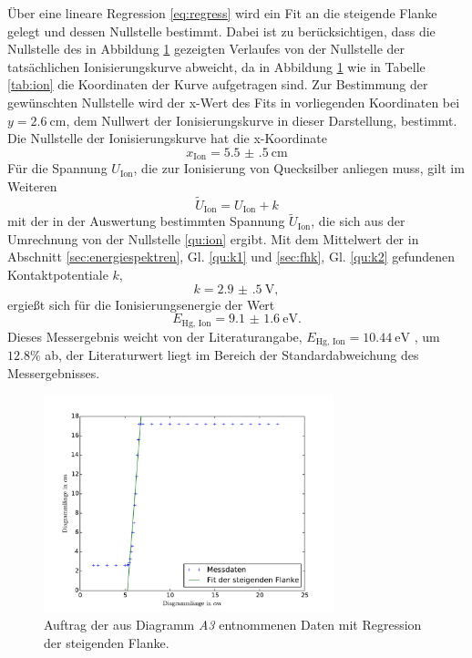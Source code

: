 Über eine lineare Regression \eqref{eq:regress} wird ein Fit an die steigende Flanke gelegt und dessen Nullstelle bestimmt.
Dabei ist zu berücksichtigen, dass die Nullstelle des in Abbildung \ref{fig:ion} gezeigten Verlaufes von der Nullstelle der tatsächlichen Ionisierungskurve abweicht, da in Abbildung \ref{fig:ion} wie in Tabelle \ref{tab:ion} die Koordinaten der Kurve aufgetragen sind.
Zur Bestimmung der gewünschten Nullstelle wird der x-Wert des Fits in vorliegenden Koordinaten bei $y=\SI{2.6}{\centi\meter}$, dem Nullwert der Ionisierungskurve in dieser Darstellung, bestimmt.
Die Nullstelle der Ionisierungskurve hat die x-Koordinate%
\begin{equation}
	x_\text{Ion}=\SI{5.5(5)}{\centi\meter}
	\label{qu:ion}
\end{equation}
Für die Spannung $U_\text{Ion}$, die zur Ionisierung von Quecksilber anliegen muss, gilt im Weiteren
\begin{equation}
	\tilde{U}_\text{Ion}=U_\text{Ion}+k
\end{equation}
mit der in der Auswertung bestimmten Spannung $\tilde{U}_\text{Ion}$, die sich aus der Umrechnung von der Nullstelle \ref{qu:ion} ergibt.
Mit dem Mittelwert der in Abschnitt \ref{sec:energiespektren}, Gl. \eqref{qu:k1} und \ref{sec:fhk}, Gl. \eqref{qu:k2} gefundenen Kontaktpotentiale $k$,
\begin{equation}
	k=\SI{2.9(5)}{\volt},
\end{equation}
ergießt sich für die Ionisierungsenergie der Wert
\begin{equation}
	E_\text{Hg, Ion}=\SI{9.1(16)}{\electronvolt}.
\end{equation}
Dieses Messergebnis weicht von der Literaturangabe, $E_\text{Hg, Ion}=\SI{10.44}{\electronvolt}$ \cite{IonHg}, um $12.8\%$ ab, 
der Literaturwert liegt im Bereich der Standardabweichung des Messergebnisses.
\begin{figure}[H]
	\centering
	\includegraphics[width=0.75\textwidth]{Bilder/Vert_ion.pdf}
	\caption{Auftrag der aus Diagramm \emph{A3} entnommenen Daten mit Regression der steigenden Flanke. \cite{matplotlib}}
	\label{fig:ion}
\end{figure}

